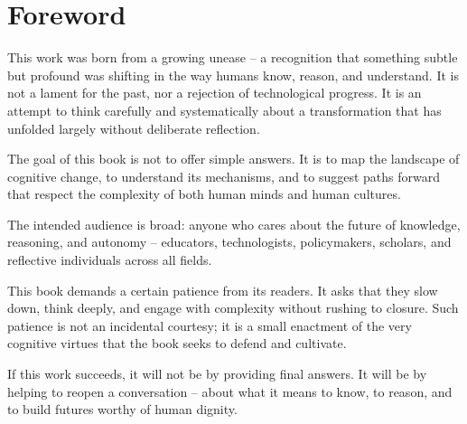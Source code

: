 \chapter*{Foreword}

This work was born from a growing unease -- a recognition that something
subtle but profound was shifting in the way humans know, reason, and
understand. It is not a lament for the past, nor a rejection of
technological progress. It is an attempt to think carefully and
systematically about a transformation that has unfolded largely without
deliberate reflection.

The goal of this book is not to offer simple answers. It is to map the
landscape of cognitive change, to understand its mechanisms, and to
suggest paths forward that respect the complexity of both human minds
and human cultures.

The intended audience is broad: anyone who cares about the future of
knowledge, reasoning, and autonomy -- educators, technologists,
policymakers, scholars, and reflective individuals across all fields.

This book demands a certain patience from its readers. It asks that they
slow down, think deeply, and engage with complexity without rushing to
closure. Such patience is not an incidental courtesy; it is a small
enactment of the very cognitive virtues that the book seeks to defend
and cultivate.

If this work succeeds, it will not be by providing final answers. It
will be by helping to reopen a conversation -- about what it means to
know, to reason, and to build futures worthy of human dignity.